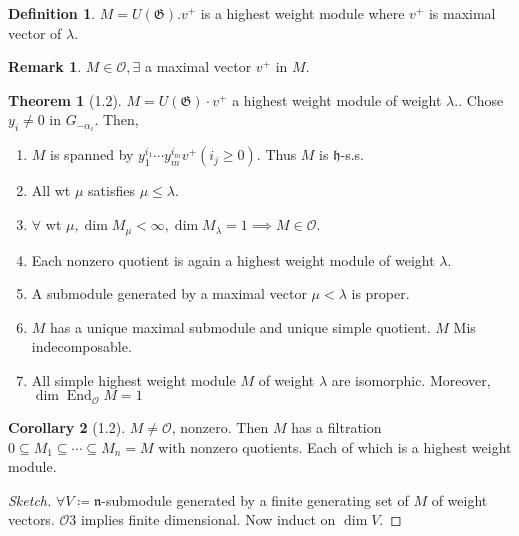 \documentclass{article}
\theoremstyle{definition}
\newtheorem*{definition}{Definition}
\newtheorem{theorem}{Theorem}
\newtheorem{corollary}[theorem]{Corollary}
\newtheorem*{remark}{Remark}
\begin{document}
    \begin{definition}
        \(M = U(\mathfrak{G}) . v^+\) is a highest weight module where \(v^+\) is maximal vector of \(\lambda\). 
    \end{definition}

    \begin{remark}
        \(M \in \mathcal{O}, \exists\) a maximal vector \(v^+\) in \(M\).
    \end{remark}

    \begin{theorem}
        [1.2] \(M = U(\mathfrak{G}) \cdot v^+\) a highest weight module of weight \(\lambda\).. Chose \(y_i \neq 0\) in \(G_{-\alpha_i}\). Then,

        \begin{enumerate}[label=\alph*)]
            \item \(M\) is spanned by \(y_1^{i_1} \cdots y_m^{i_m} v^+ (i_j \geq 0)\). Thus \(M\) is \(\mathfrak{h}\)-s.s.
            \item All wt \(\mu\) satisfies \(\mu \leq \lambda\).
            \item \(\forall\) wt \(\mu, \dim M_\mu < \infty, \dim M_\lambda = 1 \implies M \in \mathcal{O}\).
            \item Each nonzero quotient is again a highest weight module of weight \(\lambda\).
            \item A submodule generated by a maximal vector \(\mu < \lambda\) is proper.
            \item \(M\) has a unique maximal submodule and unique simple quotient. \(M\) Mis indecomposable.
            \item All simple highest weight module \(M\) of weight \(\lambda\) are isomorphic. Moreover, \(\dim \operatorname{End}_{\mathcal{O}} M = 1\)  
        \end{enumerate} 
    \end{theorem}

    \begin{corollary}
        [1.2] \(M \neq \mathcal{O}\), nonzero. Then \(M\) has a filtration \(0 \subseteq M_1 \subseteq \cdots \subseteq M_n = M\) with nonzero quotients. Each of which is a highest weight module.
    \end{corollary}

    \begin{proof}
        [Sketch] \(\forall V \coloneqq \mathfrak{n}\)-submodule generated by a finite generating set of \(M\) of weight vectors. \(\mathcal{O}3\) implies finite dimensional. Now induct on \(\dim V\).
    \end{proof}
\end{document}
